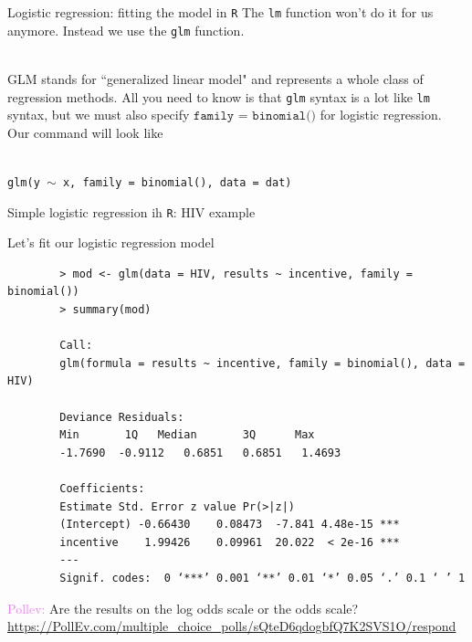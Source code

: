 \documentclass[10pt,t]{beamer}
\begin{document}
\begin{frame}{Logistic regression: fitting the model in \texttt{R}}
	The \texttt{lm} function won't do it for us anymore. Instead we use the \texttt{glm} function. 
	\\ ~\ 
	
	GLM stands for ``generalized linear model" and represents a whole class of regression methods. All you need to know is that \texttt{glm} syntax is a lot like \texttt{lm} syntax, but we must also specify $\texttt{family = binomial()}$ for logistic regression. Our command will look like
	\\ ~\
	
	\texttt{glm(y $\sim$ x, family = binomial(), data = dat)}
\end{frame}

\begin{frame}[fragile]{Simple logistic regression ih \texttt{R}: HIV example}
	\vspace{-0.5cm}
	
	Let's fit our logistic regression model 
	\footnotesize
	
	\begin{verbatim}
		> mod <- glm(data = HIV, results ~ incentive, family = binomial())
		> summary(mod)
		
		Call:
		glm(formula = results ~ incentive, family = binomial(), data = HIV)
		
		Deviance Residuals: 
		Min       1Q   Median       3Q      Max  
		-1.7690  -0.9112   0.6851   0.6851   1.4693  
		
		Coefficients:
		Estimate Std. Error z value Pr(>|z|)    
		(Intercept) -0.66430    0.08473  -7.841 4.48e-15 ***
		incentive    1.99426    0.09961  20.022  < 2e-16 ***
		---
		Signif. codes:  0 ‘***’ 0.001 ‘**’ 0.01 ‘*’ 0.05 ‘.’ 0.1 ‘ ’ 1
	\end{verbatim}
	\normalsize
	
	\textcolor{violet}{Pollev:} Are the results on the log odds scale or the odds scale? 
	\tiny{\url{https://PollEv.com/multiple_choice_polls/sQteD6qdogbfQ7K2SVS1O/respond}}
	
	
\end{frame}
\end{document}
